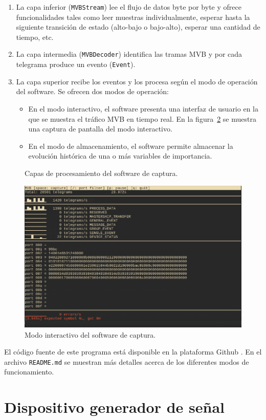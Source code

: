 \begin{enumerate}
\item La capa inferior (\texttt{MVBStream}) lee el flujo de datos byte por byte y ofrece funcionalidades tales como leer muestras individualmente, esperar hasta la siguiente transición de estado (alto-bajo o bajo-alto), esperar una cantidad de tiempo, etc.
\item La capa intermedia (\texttt{MVBDecoder}) identifica las tramas MVB y por cada telegrama produce un evento (\texttt{Event}).
\item La capa superior recibe los eventos y los procesa según el modo de operación del software. Se ofrecen dos modos de operación:
    \begin{itemize}
        \item En el modo interactivo, el software presenta una interfaz de usuario en la que se muestra el tráfico MVB en tiempo real. En la figura~\ref{fig:interactivo} se muestra una captura de pantalla del modo interactivo.
        \item En el modo de almacenamiento, el software permite almacenar la evolución histórica de una o más variables de importancia.
    \end{itemize}
\end{enumerate}

\begin{figure}[htbp]
	\centering
    {
        \fontsize{9pt}{9pt}\selectfont
        
    }
	\caption{Capas de procesamiento del software de captura.}
    \label{fig:capas-software}
\end{figure}

\begin{figure}[htbp]
	\centering
	\includegraphics[width=1\textwidth]{./Figures/modo-interactivo.png}
	\caption{Modo interactivo del software de captura.}
    \label{fig:interactivo}
\end{figure}

El código fuente de este programa está disponible en la plataforma Github \cite{mvbparse-go}.
En el archivo \texttt{README.md} se muestran más detalles acerca de los diferentes modos de funcionamiento.

\section{Dispositivo generador de señal}
\label{sec:generador}
